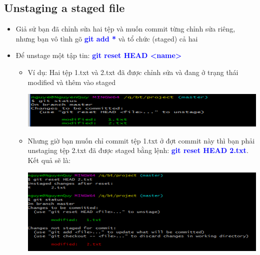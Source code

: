 \documentclass[12pt,a4paper]{report}
\begin{document}
\subsection{Unstaging a staged file}
\begin{itemize}
\item Giả sử bạn đã chỉnh sửa hai tệp và muốn commit từng chỉnh sửa riêng, nhưng bạn vô tình gõ \textcolor{blue}{\bf git add *} và tổ chức (staged) cả hai
\item Để unstage một tập tin: \textcolor{blue}{\bf git reset HEAD <name>}
	\begin{itemize}
\item Ví dụ: Hai tệp 1.txt và 2.txt đã được chỉnh sửa và đang ở trạng thái modified và thêm vào staged

	\includegraphics[width=0.8\linewidth]{screenshot029}

	\label{fig:screenshot029}

\item Nhưng giờ bạn muốn chỉ commit tệp 1.txt ở đợt commit này thì bạn phải unstaging tệp 2.txt đã được staged bằng lệnh: \textcolor{blue}{\bf git reset HEAD 2.txt}. Kết quả sẽ là:

	\includegraphics[width=0.8\linewidth]{screenshot030}

	\label{fig:screenshot030}
\end{itemize}
\end{itemize}
\end{document}
